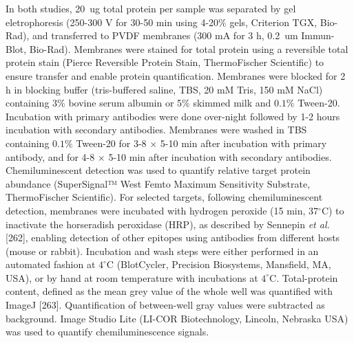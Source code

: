 \documentclass[twoside,10pt]{gihclass} %
\begin{document}
In both studies, \SI{20}{ug} total protein per sample was separated by gel eletrophoresis (250-300 V for 30-50 min using 4-20\% gels, Criterion TGX, Bio-Rad), and transferred to PVDF membranes (300 mA for 3 h, \SI{0.2}{um} Immun-Blot, Bio-Rad).
Membranes were stained for total protein using a reversible total protein stain (Pierce Reversible Protein Stain, ThermoFischer Scientific) to ensure transfer and enable protein quantification.
Membranes were blocked for 2 h in blocking buffer (tris-buffered saline, TBS, 20 mM Tris, 150 mM NaCl) containing \(3\%\) bovine serum albumin or 5\% skimmed milk and \(0.1\%\) Tween-20.
Incubation with primary antibodies were done over-night followed by 1-2 hours incubation with secondary antibodies.
Membranes were washed in TBS containing \(0.1\%\) Tween-20 for 3-8 \(\times\) 5-10 min after incubation with primary antibody, and for 4-8 \(\times\) 5-10 min after incubation with secondary antibodies.
Chemiluminescent detection was used to quantify relative target protein abundance (SuperSignal™ West Femto Maximum Sensitivity Substrate, ThermoFischer Scientific).
For selected targets, following chemiluminescent detection, membranes were incubated with hydrogen peroxide (15 min, 37\(^{\circ}\)C) to inactivate the horseradish peroxidase (HRP), as described by Sennepin \emph{et al.} {[}262{]}, enabling detection of other epitopes using antibodies from different hosts (mouse or rabbit).
Incubation and wash steps were either performed in an automated fashion at \(4^{\circ}\)C (BlotCycler, Precision Biosystems, Mansfield, MA, USA), or by hand at room temperature with incubations at \(4^{\circ}\)C.
Total-protein content, defined as the mean grey value of the whole well was quantified with ImageJ {[}263{]}. Quantification of between-well gray values were subtracted as background. Image Studio Lite (LI-COR Biotechnology, Lincoln, Nebraska USA) was used to quantify chemiluminescence signals.
\end{document}
